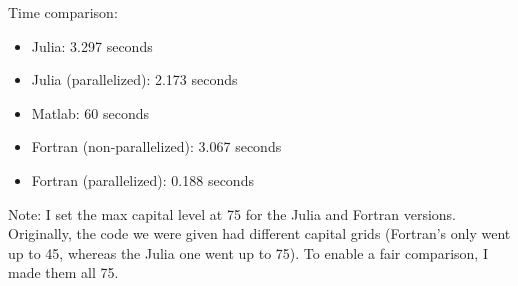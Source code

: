 \documentclass[12pt]{article}
\begin{document}
    Time comparison:
    \begin{itemize}
        \item Julia: 3.297 seconds
        \item Julia (parallelized): 2.173 seconds
        \item Matlab: 60 seconds
        \item Fortran (non-parallelized): 3.067 seconds
        \item Fortran (parallelized): 0.188 seconds
    \end{itemize}
    Note: I set the max capital level at 75 for the Julia and Fortran versions. Originally, the code we were given had different capital grids (Fortran's only went up to 45, whereas the Julia one went up to 75). To enable a fair comparison, I made them all 75.
\end{document}
